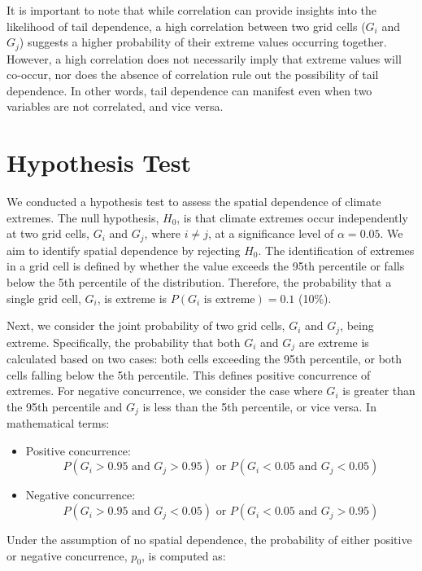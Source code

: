 \documentclass[
]{krantz}
\begin{document}
It is important to note that while correlation can provide insights into the likelihood of tail dependence, a high correlation between two grid cells (\(G_i\) and \(G_j\)) suggests a higher probability of their extreme values occurring together. However, a high correlation does not necessarily imply that extreme values will co-occur, nor does the absence of correlation rule out the possibility of tail dependence. In other words, tail dependence can manifest even when two variables are not correlated, and vice versa.

\section{Hypothesis Test}\label{hypothesis-test}

We conducted a hypothesis test to assess the spatial dependence of climate extremes. The null hypothesis, \(H_0\), is that climate extremes occur independently at two grid cells, \(G_i\) and \(G_j\), where \(i \neq j\), at a significance level of \(\alpha = 0.05\). We aim to identify spatial dependence by rejecting \(H_0\). The identification of extremes in a grid cell is defined by whether the value exceeds the 95th percentile or falls below the 5th percentile of the distribution. Therefore, the probability that a single grid cell, \(G_i\), is extreme is \(P(G_i \text{ is extreme}) = 0.1\) (10\%).

Next, we consider the joint probability of two grid cells, \(G_i\) and \(G_j\), being extreme. Specifically, the probability that both \(G_i\) and \(G_j\) are extreme is calculated based on two cases: both cells exceeding the 95th percentile, or both cells falling below the 5th percentile. This defines positive concurrence of extremes. For negative concurrence, we consider the case where \(G_i\) is greater than the 95th percentile and \(G_j\) is less than the 5th percentile, or vice versa. In mathematical terms:

\begin{itemize}
\item
  Positive concurrence:
  \[
  P(G_i > 0.95 \text{ and } G_j > 0.95) \text{ or } P(G_i < 0.05 \text{ and } G_j < 0.05)
  \]
\item
  Negative concurrence:
  \[
  P(G_i > 0.95 \text{ and } G_j < 0.05) \text{ or } P(G_i < 0.05 \text{ and } G_j > 0.95)
  \]
\end{itemize}

Under the assumption of no spatial dependence, the probability of either positive or negative concurrence, \(p_0\), is computed as:
\end{document}
